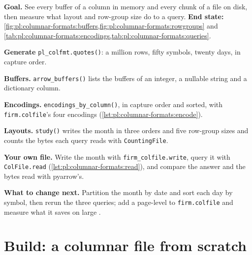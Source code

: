 \begin{tutorial}
\textbf{Goal.} See every buffer of a column in memory and every chunk of a file on disk, then measure what layout and row-group
size do to a query. \textbf{End state:} \cref{fig:pl:columnar-formats:buffers,fig:pl:columnar-formats:rowgroups} and
\cref{tab:pl:columnar-formats:encodings,tab:pl:columnar-formats:queries}.
\begin{tutsteps}
\item \textbf{Generate} \texttt{pl\_colfmt.quotes()}: a million rows, fifty symbols, twenty days, in capture order.
\item \textbf{Buffers.} \texttt{arrow\_buffers()} lists the buffers of an integer, a nullable string and a dictionary column.
\item \textbf{Encodings.} \texttt{encodings\_by\_column()}, in capture order and sorted, with \texttt{firm.colfile}'s four
encodings (\cref{lst:pl:columnar-formats:encode}).
\item \textbf{Layouts.} \texttt{study()} writes the month in three orders and five row-group sizes and counts the bytes each query
reads with \texttt{CountingFile}.
\item \textbf{Your own file.} Write the month with \texttt{firm\_colfile.write}, query it with \texttt{ColFile.read}
(\cref{lst:pl:columnar-formats:read}), and compare the answer and the bytes read with pyarrow's.
\end{tutsteps}
\textbf{What to change next.} Partition the month by date and sort each day by symbol, then rerun the three queries; add a
page-level  to \texttt{firm.colfile} and measure what it saves on large .
\end{tutorial}

\section{Build: a columnar file from scratch}\label{bld:pl:columnar-formats:colfile}

